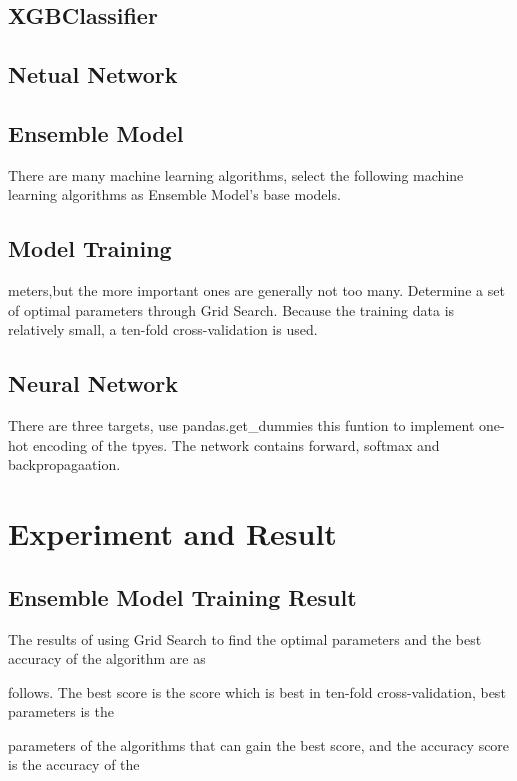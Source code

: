 \subsection{XGBClassifier}
 

\subsection{Netual Network}


\subsection{Ensemble Model}
There are many machine learning algorithms, 
select the following machine learning algorithms as Ensemble Model’s base models. 



\subsection{Model Training}
meters,but the more important ones are generally not too many. Determine a set of optimal parameters through Grid Search. Because the training data is relatively small, a ten-fold cross-validation is used. %

\subsection{Neural Network}
There are three targets, 
use pandas.get_dummies this funtion to implement one-hot encoding of the tpyes.
The network contains forward, 
softmax and backpropagaation.


\section{Experiment and Result}

\subsection{Ensemble Model Training Result}

The results of using Grid Search to find the optimal parameters and the best accuracy of the algorithm are as 
 
follows. The best score is the score which is best in ten-fold cross-validation, best parameters is the 

parameters of the algorithms that can gain the best score, and the accuracy score is the accuracy of the 

